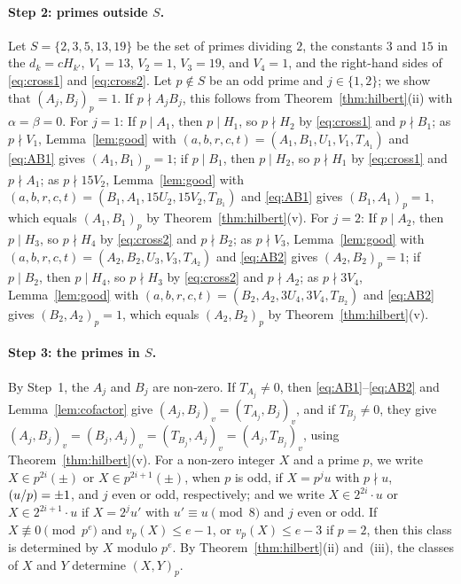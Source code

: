 \documentclass[11pt]{article}
\newcommand{\leg}[2]{\mathchoice{\biggl(\dfrac{#1}{#2}\biggr)}{(#1/#2)}{(#1/#2)}{(#1/#2)}}
\begin{document}
\paragraph{Step 2: primes outside $S$.} Let $S=\{2,3,5,13,19\}$ be the set of primes dividing $2$, the constants $3$ and $15$ in the $d_k=cH_{k'}$, $V_{1}=13$, $V_{2}=1$, $V_{3}=19$, and $V_{4}=1$, and the right-hand sides of \eqref{eq:cross1} and \eqref{eq:cross2}. Let $p\notin S$ be an odd prime and $j\in\{1,2\}$; we show that $(A_j,B_j)_p=1$. If $p\nmid A_jB_j$, this follows from Theorem~\ref{thm:hilbert}(ii) with $\alpha=\beta=0$. For $j=1$: If $p\mid A_{1}$, then $p\mid H_{1}$, so $p\nmid H_{2}$ by \eqref{eq:cross1} and $p\nmid B_{1}$; as $p\nmid V_{1}$, Lemma~\ref{lem:good} with $(a,b,r,c,t)=(A_{1},B_{1},U_{1},V_{1},T_{A_{1}})$ and \eqref{eq:AB1} gives $(A_{1},B_{1})_p=1$; if $p\mid B_{1}$, then $p\mid H_{2}$, so $p\nmid H_{1}$ by \eqref{eq:cross1} and $p\nmid A_{1}$; as $p\nmid 15V_{2}$, Lemma~\ref{lem:good} with $(a,b,r,c,t)=(B_{1},A_{1},15U_{2},15V_{2},T_{B_{1}})$ and \eqref{eq:AB1} gives $(B_{1},A_{1})_p=1$, which equals $(A_{1},B_{1})_p$ by Theorem~\ref{thm:hilbert}(v). For $j=2$: If $p\mid A_{2}$, then $p\mid H_{3}$, so $p\nmid H_{4}$ by \eqref{eq:cross2} and $p\nmid B_{2}$; as $p\nmid V_{3}$, Lemma~\ref{lem:good} with $(a,b,r,c,t)=(A_{2},B_{2},U_{3},V_{3},T_{A_{2}})$ and \eqref{eq:AB2} gives $(A_{2},B_{2})_p=1$; if $p\mid B_{2}$, then $p\mid H_{4}$, so $p\nmid H_{3}$ by \eqref{eq:cross2} and $p\nmid A_{2}$; as $p\nmid 3V_{4}$, Lemma~\ref{lem:good} with $(a,b,r,c,t)=(B_{2},A_{2},3U_{4},3V_{4},T_{B_{2}})$ and \eqref{eq:AB2} gives $(B_{2},A_{2})_p=1$, which equals $(A_{2},B_{2})_p$ by Theorem~\ref{thm:hilbert}(v).

\paragraph{Step 3: the primes in $S$.} By Step~1, the $A_j$ and $B_j$ are non-zero. If $T_{A_j}\neq0$, then \eqref{eq:AB1}--\eqref{eq:AB2} and Lemma~\ref{lem:cofactor} give $(A_j,B_j)_v=(T_{A_j},B_j)_v$, and if $T_{B_j}\neq0$, they give $(A_j,B_j)_v=(B_j,A_j)_v=(T_{B_j},A_j)_v=(A_j,T_{B_j})_v$, using Theorem~\ref{thm:hilbert}(v). For a non-zero integer $X$ and a prime $p$, we write $X\in p^{2i}(\pm)$ or $X\in p^{2i+1}(\pm)$, when $p$ is odd, if $X=p^ju$ with $p\nmid u$, $\leg{u}{p}=\pm1$, and $j$ even or odd, respectively; and we write $X\in2^{2i}\cdot u$ or $X\in2^{2i+1}\cdot u$ if $X=2^ju'$ with $u'\equiv u\pmod 8$ and $j$ even or odd. If $X\not\equiv0\pmod{p^e}$ and $v_p(X)\leq e-1$, or $v_p(X)\leq e-3$ if $p=2$, then this class is determined by $X$ modulo $p^e$. By Theorem~\ref{thm:hilbert}(ii) and~(iii), the classes of $X$ and $Y$ determine $(X,Y)_p$.
\end{document}
